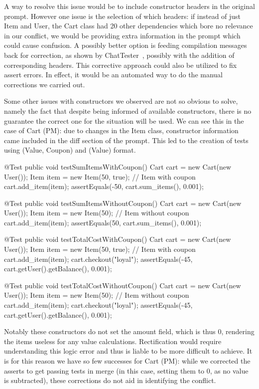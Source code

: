 A way to resolve this issue would be to include constructor headers in the original prompt. However one issue is the selection of which
headers: if instead of just Item and User, the Cart class had 20 other dependencies which bore no relevance in our conflict, we would be
providing extra information in the prompt which could cause confusion. A possibly better option is feeding compilation messages back for correction,
as shown by ChatTester~\cite{kn:chattester}, possibly with the addition of corresponding headers. This corrective approach could also be utilized
to fix assert errors. In effect, it would be an automated way to do the manual corrections we carried out.

Some other issues with constructors we observed are not so obvious to solve, namely the fact that despite being informed of available constructors, there is no guarantee
the correct one for the situation will be used. We can see this in the case of Cart (PM): due to changes in the Item class, constructor information came included
in the diff section of the prompt. This led to the creation of tests using (Value, Coupon) and (Value) format.
\begin{response}
    @Test
    public void testSumItemsWithCoupon() {
        Cart cart = new Cart(new User());
        Item item = new Item(50, true); // Item with coupon
        cart.add_item(item);
        assertEquals(-50, cart.sum_items(), 0.001);
    }

    @Test
    public void testSumItemsWithoutCoupon() {
        Cart cart = new Cart(new User());
        Item item = new Item(50); // Item without coupon
        cart.add_item(item);
        assertEquals(50, cart.sum_items(), 0.001);
    }

    @Test
    public void testTotalCostWithCoupon() {
        Cart cart = new Cart(new User());
        Item item = new Item(50, true); // Item with coupon
        cart.add_item(item);
        cart.checkout("loyal");
        assertEquals(-45, cart.getUser().getBalance(), 0.001);
    }

    @Test
    public void testTotalCostWithoutCoupon() {
        Cart cart = new Cart(new User());
        Item item = new Item(50); // Item without coupon
        cart.add_item(item);
        cart.checkout("loyal");
        assertEquals(-45, cart.getUser().getBalance(), 0.001);
    }
\end{response}
Notably these constructors do not set the amount field, which is thus 0, rendering the items useless for any value calculations.
Rectification would require understanding this logic error and thus is liable to be more difficult to achieve. It is for this reason
we have so few successes for Cart (PM): while we corrected the asserts to get passing tests in merge (in this case, setting them to 0, as no
value is subtracted), these corrections do not aid in identifying the conflict.

